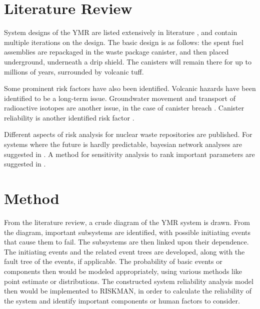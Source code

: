 \documentclass[12pt]{article}
\begin{document}
\section{Literature Review}
System designs of the \gls{YMR} are listed extensively in literature \cite{u.s._department_of_energy_office_of_civilian_radioactive_waste_management_national_2008, wilson_total-system_1994, rechard_evolution_2014}, and contain multiple
iterations on the design. The basic design is as follows: the spent fuel assemblies
are repackaged in the waste package canister, and then placed underground,
underneath a drip shield. The canisters will remain there for up to millions of years,
surrounded by volcanic tuff.

Some prominent risk factors have also been identified. Volcanic hazards \cite{ho_risk_1992, smith_area_1990}
have been identified to be a long-term issue. Groundwater movement and transport of 
radioactive isotopes are another issue, in the case of canister breach \cite{robison_ground-water_1984, quade_fossil_1995}.  Canister reliability is another
identified risk factor \cite{whipple_can_1996, rutqvist_analysis_2003}.

Different aspects of risk analysis for nuclear waste repositories are published.
For systems where the future is hardly predictable, bayesian network analyses are 
suggested in \cite{lee_application_2006}. A method for sensitivity analysis
to rank important parameters are suggested in \cite{mohanty_cdf_2001}.


\section{Method}

From the literature review, a crude diagram of the \gls{YMR} system is drawn.
From the diagram, important subsystems are identified, with possible initiating
events that cause them to fail. The subsystems are then linked upon their dependence.
The initiating events and the related event trees are developed, along with the
fault tree of the events, if applicable. The probability of basic events or components
then would be modeled
appropriately, using various methods like point estimate or distributions.
The constructed system reliability analysis model then would be implemented to
RISKMAN, in order to calculate the reliability of the system and identify
important components or human factors to consider.













\end{document}

